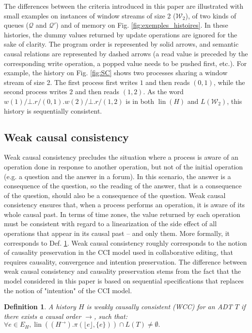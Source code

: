 \documentclass[9pt,numbers]{sigplanconf}
\newtheorem{definition}{Definition}
\DeclareMathOperator{\lin}{lin}
\begin{document}
The differences between the criteria introduced in this paper are illustrated with small examples 
on instances of window streams of size 2 ($\mathcal{W}_2$), of two kinds of
queues ($\mathcal{Q}$ and $\mathcal{Q}'$) and of memory on Fig. \ref{fig:exemples_histoires}.
In these histories, the dummy values returned by update operations are ignored for the sake of clarity.
The program order is represented by solid arrows, and semantic causal relations are represented by dashed arrows 
(a read value is preceded by the corresponding write operation, a popped value needs to be pushed first, etc.).
For example, the history on Fig. \ref{fig:SC} shows two processes sharing a window stream of size 2. 
The first process first writes $1$ and then reads $(0,1)$, while the second process writes $2$ 
and then reads $(1, 2)$. As the word $w(1)/\bot.r/(0,1).w(2)/\bot.r/(1,2)$ 
is in both $\lin(H)$ and $L(\mathcal{W}_2)$, this history is sequentially consistent.

\subsection{Weak causal consistency}

Weak causal consistency precludes the situation where a process is aware of an operation 
done in response to another operation, but not of the initial operation (e.g. a question and the answer in a forum). 
In this scenario, the answer is a consequence of the question, so the
reading of the answer, that is a consequence of the question, should also be a
consequence of the question. Weak causal consistency ensures that, 
when a process performs an operation, it is aware of its whole causal past. 
In terms of time zones, the value returned by each operation
must be consistent with regard to a linearization of the side effect of 
all operations that appear in its causal past -- and only them. 
More formally, it corresponds to Def. \ref{def:weak_causal_consistency}. 
Weak causal consistency roughly corresponds to the notion of causality preservation 
in the CCI model \cite{sun1998achieving} used in collaborative editing, that requires
causality, convergence and intention 
preservation. The difference between weak causal consistency and causality preservation
stems from the fact that the model considered in this paper is based on sequential
specifications that replaces the notion of "intention" of the CCI model. 
\pagebreak

\begin{definition}\label{def:weak_causal_consistency} 
  A history $H$ is \emph{weakly causally consistent} (WCC) for an ADT $T$ if
  there exists a causal order $\rightarrow$, such that:
  $\forall e\in E_H, \lin((H^\rightarrow).\pi(\lfloor e\rfloor, \{e\}))\cap L(T) \neq \emptyset.$
\end{definition}
\vspace{1mm}
\end{document}
